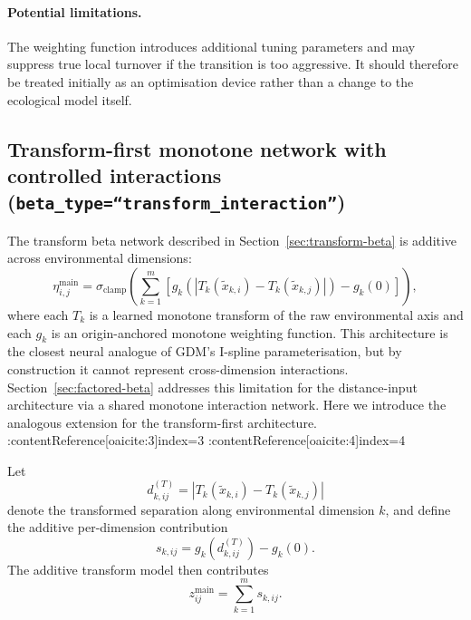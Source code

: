 \documentclass{article}
\begin{document}
\paragraph{Potential limitations.}
The weighting function introduces additional tuning parameters and may suppress true local turnover if the transition is too aggressive. It should therefore be treated initially as an optimisation device rather than a change to the ecological model itself.

\subsection{Transform-first monotone network with controlled interactions (\texttt{beta\_type=``transform\_interaction''})}
\label{sec:transform-interaction-beta}

The transform beta network described in Section~\ref{sec:transform-beta} is additive across environmental dimensions:
\begin{equation}
    \eta_{i,j}^{\text{main}}
    =
    \sigma_{\text{clamp}}\!\left(
        \sum_{k=1}^{m}
        \left[
            g_k\!\left(
                \left|T_k(\tilde{x}_{k,i}) - T_k(\tilde{x}_{k,j})\right|
            \right)
            -
            g_k(0)
        \right]
    \right),
\end{equation}
where each $T_k$ is a learned monotone transform of the raw environmental axis and each $g_k$ is an origin-anchored monotone weighting function. This architecture is the closest neural analogue of GDM's I-spline parameterisation, but by construction it cannot represent cross-dimension interactions. Section~\ref{sec:factored-beta} addresses this limitation for the distance-input architecture via a shared monotone interaction network. Here we introduce the analogous extension for the transform-first architecture. :contentReference[oaicite:3]{index=3} :contentReference[oaicite:4]{index=4}

Let
\begin{equation}
    d_{k,ij}^{(T)}
    =
    \left|T_k(\tilde{x}_{k,i}) - T_k(\tilde{x}_{k,j})\right|
\end{equation}
denote the transformed separation along environmental dimension $k$, and define the additive per-dimension contribution
\begin{equation}
    s_{k,ij}
    =
    g_k\!\left(d_{k,ij}^{(T)}\right) - g_k(0).
\end{equation}
The additive transform model then contributes
\begin{equation}
    z_{ij}^{\text{main}} = \sum_{k=1}^{m} s_{k,ij}.
\end{equation}
\end{document}
